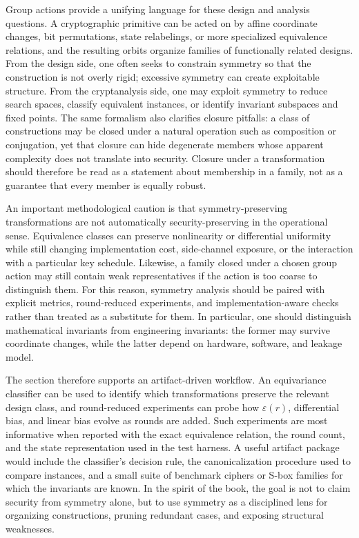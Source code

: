 \documentclass[11pt]{article}
\begin{document}
Group actions provide a unifying language for these design and analysis questions. A cryptographic primitive can be acted on by affine coordinate changes, bit permutations, state relabelings, or more specialized equivalence relations, and the resulting orbits organize families of functionally related designs. From the design side, one often seeks to constrain symmetry so that the construction is not overly rigid; excessive symmetry can create exploitable structure. From the cryptanalysis side, one may exploit symmetry to reduce search spaces, classify equivalent instances, or identify invariant subspaces and fixed points. The same formalism also clarifies closure pitfalls: a class of constructions may be closed under a natural operation such as composition or conjugation, yet that closure can hide degenerate members whose apparent complexity does not translate into security. Closure under a transformation should therefore be read as a statement about membership in a family, not as a guarantee that every member is equally robust.

An important methodological caution is that symmetry-preserving transformations are not automatically security-preserving in the operational sense. Equivalence classes can preserve nonlinearity or differential uniformity while still changing implementation cost, side-channel exposure, or the interaction with a particular key schedule. Likewise, a family closed under a chosen group action may still contain weak representatives if the action is too coarse to distinguish them. For this reason, symmetry analysis should be paired with explicit metrics, round-reduced experiments, and implementation-aware checks rather than treated as a substitute for them. In particular, one should distinguish mathematical invariants from engineering invariants: the former may survive coordinate changes, while the latter depend on hardware, software, and leakage model.

The section therefore supports an artifact-driven workflow. An equivariance classifier can be used to identify which transformations preserve the relevant design class, and round-reduced experiments can probe how $\varepsilon(r)$, differential bias, and linear bias evolve as rounds are added. Such experiments are most informative when reported with the exact equivalence relation, the round count, and the state representation used in the test harness. A useful artifact package would include the classifier's decision rule, the canonicalization procedure used to compare instances, and a small suite of benchmark ciphers or S-box families for which the invariants are known. In the spirit of the book, the goal is not to claim security from symmetry alone, but to use symmetry as a disciplined lens for organizing constructions, pruning redundant cases, and exposing structural weaknesses.
\end{document}
